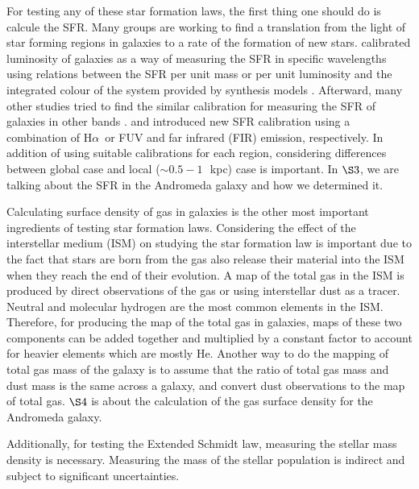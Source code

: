 \documentclass[useAMS,usenatbib]{mn2e}
\newcommand \kpc        {\,{\rm kpc}}
\newcommand \halpha    {H$\alpha $\ }
\begin{document}
For testing any of these star formation laws, the first thing one should do is calcule the SFR. Many groups are working to find a translation from the light of star forming regions in galaxies to a rate of the formation of new stars. \cite{Kennicutt98b} calibrated luminosity of galaxies as a way of measuring the SFR in specific wavelengths using relations between the SFR per unit mass or per unit luminosity and the integrated colour of the system provided by synthesis models  \citep[e.g.,][]{Bruzual93}. Afterward, many other studies tried to find the similar calibration for measuring the SFR of galaxies in other bands \citep[e.g.,][]{Kennicutt12, Calzetti13, Zhu08, Kennicutt09, Boquien10, Boquien11, Hao11}. \cite{Kennicutt09} and \cite{Hao11} introduced new SFR calibration using a combination of \halpha or FUV and far infrared (FIR) emission, respectively. In addition of using suitable calibrations for each region, considering differences between global case and local ($\sim 0.5-1$~\kpc) case is important. In $\S3$, we are talking about the SFR in the Andromeda galaxy and how we determined it.


Calculating surface density of gas in galaxies is the other most important ingredients of testing star formation laws. Considering the effect of the interstellar medium (ISM) on studying the star formation law is important due to the fact that stars are born from the gas also release their material into the ISM when they reach the end of their evolution. A map of the total gas in the ISM is produced by direct observations of the gas or using interstellar dust as a tracer. Neutral and molecular hydrogen are the most common elements in the ISM. Therefore, for producing the map of the total gas in galaxies, maps of these two components can be added together and multiplied by a constant factor to account for heavier elements which are mostly He. Another way to do the mapping of total gas mass of the galaxy is to assume that the ratio of total gas mass and dust mass is the same across a galaxy, and convert dust observations to the map of total gas. $\S4$ is about the calculation of the gas surface density for the Andromeda galaxy.


Additionally, for testing the Extended Schmidt law, measuring the stellar mass density is necessary. Measuring the mass of the stellar population is indirect and subject to significant uncertainties.%
\end{document}
